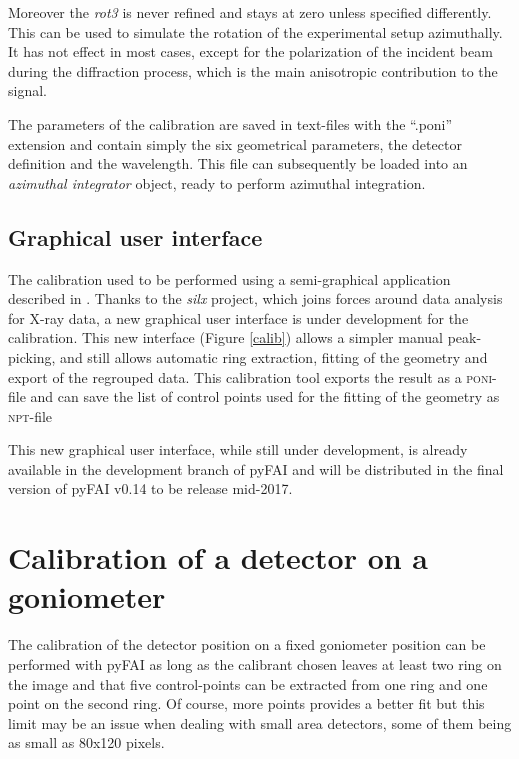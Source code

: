 \documentclass{iucr}              %
\begin{document}
Moreover the \textit{rot3} is never refined and stays at zero unless specified
differently.  This can be used to simulate the rotation of the
experimental setup azimuthally. It has not effect in most cases, except for the
polarization of the incident beam during the diffraction process, which is the
main anisotropic contribution to the signal.

The parameters of the calibration are saved in text-files with the ``.poni''
extension and contain simply the six geometrical parameters, the detector
definition and the wavelength. 
This file can subsequently be loaded into an \textit{azimuthal integrator}
object, ready to perform azimuthal integration.

\subsection{Graphical user interface}

The calibration used to be performed using a
semi-graphical application described in \cite{fv5028}. 
Thanks to the \textit{silx}\cite{silx} project, which joins forces around data
analysis for X-ray data, a new graphical user interface is under development for
the calibration. 
This new interface (Figure \ref{calib}) allows a simpler manual peak-picking,
and still allows automatic ring extraction, fitting of the geometry and export
of the regrouped data. 
This calibration tool exports the result as a \textsc{poni}-file and can
save the list of control points used  for the fitting of the geometry as
\textsc{npt}-file

This new graphical user interface, while still under development, is already
available in the development branch of pyFAI and will be distributed in the
final version of pyFAI v0.14 to be release mid-2017.

\section{Calibration of a detector on a goniometer}

The calibration of the detector position on a fixed goniometer position can be
performed with pyFAI as long as the calibrant chosen leaves at least two ring on
the image and that five control-points can be extracted from one ring and
one point on the second ring. 
Of course, more points provides a better fit but this limit may be an issue
when dealing with small area detectors, some of them being as small as 80x120 pixels.
\end{document}
